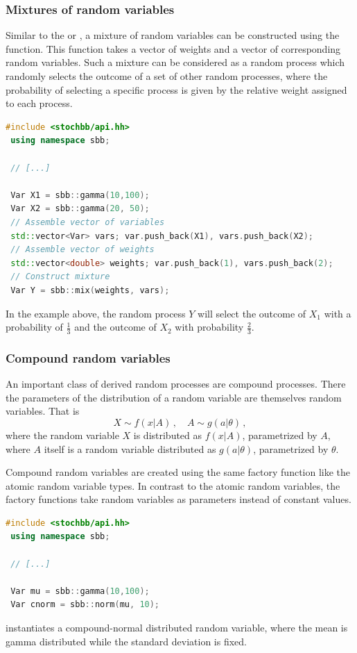 \documentclass[a4paper, 10pt]{paper}
\begin{document}
\subsubsection{Mixtures of random variables}
Similar to the  or , a mixture of random variables can be
constructed using the  function. This function takes a vector of weights and a vector
of corresponding random variables. Such a mixture can be considered as a random process which
randomly selects the outcome of a set of other random processes, where the probability of
selecting a specific process is given by the relative weight assigned to each process.
\begin{lstlisting}[language=C++]
 #include <stochbb/api.hh>
 using namespace sbb;

 // [...]

 Var X1 = sbb::gamma(10,100);
 Var X2 = sbb::gamma(20, 50);
 // Assemble vector of variables
 std::vector<Var> vars; var.push_back(X1), vars.push_back(X2);
 // Assemble vector of weights
 std::vector<double> weights; var.push_back(1), vars.push_back(2);
 // Construct mixture
 Var Y = sbb::mix(weights, vars);
\end{lstlisting}

In the example above, the random process $Y$ will select the outcome of $X_1$ with
a probability of $\frac{1}{3}$ and the outcome of $X_2$ with probability
$\frac{2}{3}$.

\subsubsection{Compound random variables}
An important class of derived random processes are compound processes. There the parameters of the
distribution of a random variable are themselves random variables. That is
\begin{equation}
 X \sim f(x|A)\,,\quad A \sim g(a|\theta)\,, \nonumber
\end{equation}
where the random variable $X$ is distributed as $f(x|A)$, parametrized by $A$,
where $A$ itself is a random variable distributed as $g(a|\theta)$, parametrized by
$\theta$. 

Compound random variables are created using the same factory function like the atomic random variable
types. In contrast to the atomic random variables, the factory functions take random variables as 
parameters instead of constant values.
\begin{lstlisting}[language=C++]
 #include <stochbb/api.hh>
 using namespace sbb;
 
 // [...]
 
 Var mu = sbb::gamma(10,100);
 Var cnorm = sbb::norm(mu, 10);
\end{lstlisting}
instantiates a compound-normal distributed random variable, where the mean is gamma distributed
while the standard deviation is fixed.
\end{document}
